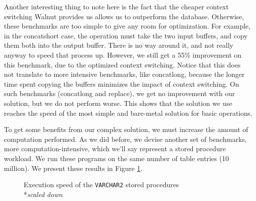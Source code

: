 \documentclass[twoside,11pt,a4paper]{article}
\newcommand{\pls}[1]{\small\texttt{#1}\normalsize}
\newcommand{\plstype}[1]{\pls{#1}}
\newcommand{\varchar}{\plstype{VARCHAR2}}
\newcommand{\bench}[1]{\textsf{#1}}
\begin{document}
Another interesting thing to note here is the fact that the cheaper context switching Walnut provides us allows us to outperform the database. Otherwise, these benchmarks are too simple to give any room for optimization. For example, in the \bench{concatshort} case, the operation must take the two input buffers, and copy them both into the output buffer. There is no way around it, and not really anyway to speed that process up. However, we still get a 55\% improvement on this benchmark, due to the optimized context switching. Notice that this does not translate to more intensive benchmarks, like \bench{concatlong}, because the longer time spent copying the buffers minimizes the impact of context switching. On such benchmarks (\bench{concatlong} and \bench{replace}), we get no improvement with our solution, but we do not perform worse. This shows that the solution we use reaches the speed of the most simple and bare-metal solution for basic operations.

To get some benefits from our complex solution, we must increase the amount of computation performed. As we did before, we devise another set of benchmarks, more computation-intensive, which we'll say represent a stored procedure workload. We run these programs on the same number of table entries (10 million). We present these results in Figure \ref{fig:exp3b}.

\begin{figure}[tp]
	\centering
	\caption[Execution speed of the \varchar{} stored procedures]{Execution speed of the \varchar{} stored procedures\\
			\hspace*{-4cm}*\textit{scaled down}}
	\label{fig:exp3b}
\end{figure}
\end{document}
